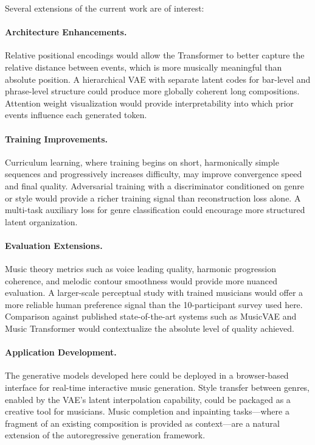 \documentclass{article}
\begin{document}
Several extensions of the current work are of interest:

\paragraph{Architecture Enhancements.}
Relative positional encodings \cite{huang2018music} would allow the Transformer to better capture the relative distance between events, which is more musically meaningful than absolute position. A hierarchical VAE \cite{vahdat2020nvae} with separate latent codes for bar-level and phrase-level structure could produce more globally coherent long compositions. Attention weight visualization would provide interpretability into which prior events influence each generated token.

\paragraph{Training Improvements.}
Curriculum learning, where training begins on short, harmonically simple sequences and progressively increases difficulty, may improve convergence speed and final quality. Adversarial training with a discriminator conditioned on genre or style would provide a richer training signal than reconstruction loss alone. A multi-task auxiliary loss for genre classification could encourage more structured latent organization.

\paragraph{Evaluation Extensions.}
Music theory metrics such as voice leading quality, harmonic progression coherence, and melodic contour smoothness would provide more nuanced evaluation. A larger-scale perceptual study with trained musicians would offer a more reliable human preference signal than the 10-participant survey used here. Comparison against published state-of-the-art systems such as MusicVAE \cite{roberts2018hierarchical} and Music Transformer \cite{huang2018music} would contextualize the absolute level of quality achieved.

\paragraph{Application Development.}
The generative models developed here could be deployed in a browser-based interface for real-time interactive music generation. Style transfer between genres, enabled by the VAE's latent interpolation capability, could be packaged as a creative tool for musicians. Music completion and inpainting tasks—where a fragment of an existing composition is provided as context—are a natural extension of the autoregressive generation framework.
\end{document}
